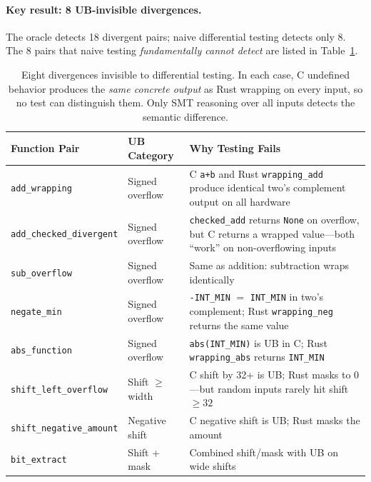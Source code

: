 \documentclass[11pt]{article}
\begin{document}
\paragraph{Key result: 8 UB-invisible divergences.}
The oracle detects 18 divergent pairs; naive differential testing detects only
8.  The 8 pairs that naive testing \emph{fundamentally cannot detect} are
listed in Table~\ref{tab:ub-invisible}.

\begin{table}[t]
\centering
\caption{Eight divergences invisible to differential testing.  In each case,
         C undefined behavior produces the \emph{same concrete output} as
         Rust wrapping on every input, so no test can distinguish them.
         Only SMT reasoning over all inputs detects the semantic
         difference.}\label{tab:ub-invisible}
\begin{tabular}{@{}llp{6.5cm}@{}}
\toprule
\textbf{Function Pair} & \textbf{UB Category} & \textbf{Why Testing Fails} \\
\midrule
\texttt{add\_wrapping}         & Signed overflow &
  C \texttt{a+b} and Rust \texttt{wrapping\_add} produce identical
  two's complement output on all hardware \\
\texttt{add\_checked\_divergent} & Signed overflow &
  \texttt{checked\_add} returns \texttt{None} on overflow, but C returns
  a wrapped value---both ``work'' on non-overflowing inputs \\
\texttt{sub\_overflow}         & Signed overflow &
  Same as addition: subtraction wraps identically \\
\texttt{negate\_min}           & Signed overflow &
  \texttt{-INT\_MIN} $=$ \texttt{INT\_MIN} in two's complement;
  Rust \texttt{wrapping\_neg} returns the same value \\
\texttt{abs\_function}         & Signed overflow &
  \texttt{abs(INT\_MIN)} is UB in C; Rust \texttt{wrapping\_abs}
  returns \texttt{INT\_MIN} \\
\texttt{shift\_left\_overflow} & Shift $\geq$ width &
  C shift by 32+ is UB; Rust masks to 0---but random inputs rarely
  hit shift $\geq 32$ \\
\texttt{shift\_negative\_amount} & Negative shift &
  C negative shift is UB; Rust masks the amount \\
\texttt{bit\_extract}          & Shift + mask &
  Combined shift/mask with UB on wide shifts \\
\bottomrule
\end{tabular}
\end{table}
\end{document}
